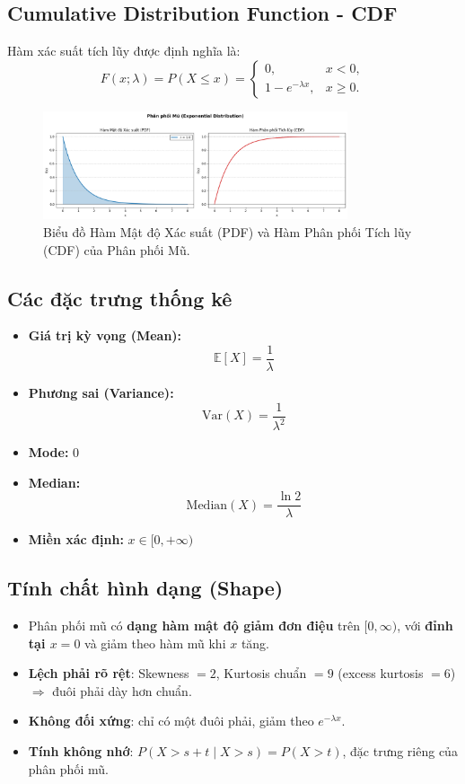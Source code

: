 \subsection{Cumulative Distribution Function - CDF}

Hàm xác suất tích lũy được định nghĩa là:
\[
F(x;\lambda) = P(X \le x) =
\begin{cases}
0, & x < 0,\\[0.5em]
1 - e^{-\lambda x}, & x \ge 0.
\end{cases}
\]

\begin{figure}[h!]
 \centering
 \includegraphics[width=0.8\textwidth]{images/Exp_PDF_and_CDF.png}
\caption{Biểu đồ Hàm Mật độ Xác suất (PDF) và Hàm Phân phối Tích lũy (CDF) của Phân phối Mũ.}
\label{fig:exponential_dist}
\end{figure}

\subsection{Các đặc trưng thống kê}

\begin{itemize}
    \item \textbf{Giá trị kỳ vọng (Mean):}
    \[
    \mathbb{E}[X] = \frac{1}{\lambda}
    \]
    \item \textbf{Phương sai (Variance):}
    \[
    \mathrm{Var}(X) = \frac{1}{\lambda^2}
    \]
    \item \textbf{Mode:} $0$
    \item \textbf{Median:}
    \[
    \mathrm{Median}(X) = \frac{\ln 2}{\lambda}
    \]
    \item \textbf{Miền xác định:} $x \in [0, +\infty)$
\end{itemize}

\subsection{Tính chất hình dạng (Shape)}

\begin{itemize}
    \item Phân phối mũ có \textbf{dạng hàm mật độ giảm đơn điệu} trên $[0,\infty)$, với \textbf{đỉnh tại $x=0$} và giảm theo hàm mũ khi $x$ tăng.
    \item \textbf{Lệch phải rõ rệt}: Skewness $= 2$, Kurtosis chuẩn $= 9$ (excess kurtosis $= 6$) $\Rightarrow$ đuôi phải dày hơn chuẩn.
    \item \textbf{Không đối xứng}: chỉ có một đuôi phải, giảm theo $e^{-\lambda x}$.
    \item \textbf{Tính không nhớ}: $P(X > s + t \mid X > s) = P(X > t)$, đặc trưng riêng của phân phối mũ.
\end{itemize}

